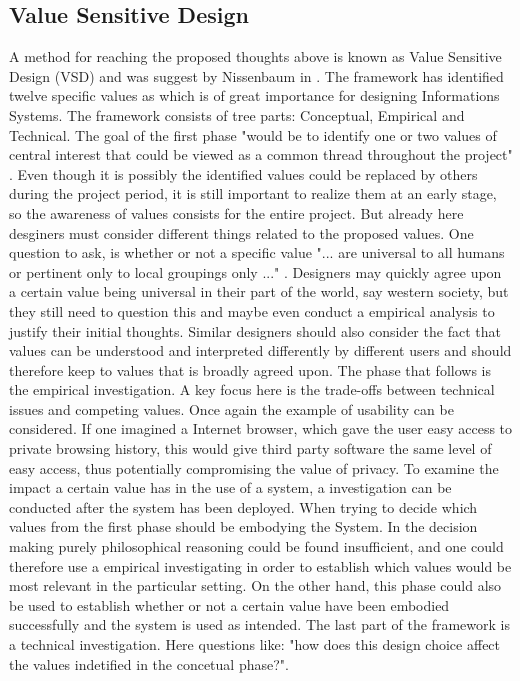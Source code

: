 \subsection{Value Sensitive Design}
A method for reaching the proposed thoughts above is known as Value Sensitive Design (VSD) and was suggest by Nissenbaum in . The framework has identified twelve specific values as which is of great importance for designing Informations Systems. The framework consists of tree parts: Conceptual, Empirical and Technical.
The goal of the first phase "would be to identify one or two values of central interest that could be viewed as a common thread throughout the project" . Even though it is possibly the identified values could be replaced by others during the project period, it is still important to realize them at an early stage, so the awareness of values consists for the entire project. But already here desginers must consider different things related to the proposed values. One question to ask, is whether or not a specific value "... are universal to all humans or pertinent only to local groupings only ..." . Designers may quickly agree upon a certain value being universal in their part of the world, say western society, but they still need to question this and maybe even conduct a empirical analysis to justify their initial thoughts. Similar designers should also consider the fact that values can be understood and interpreted differently by different users and should therefore keep to values that is broadly agreed upon. 
The phase that follows is the empirical investigation. A key focus here is the trade-offs between technical issues and competing values. Once again the example of usability can be considered. If one imagined a Internet browser, which gave the user easy access to private browsing history, this would give third party software the same level of easy access, thus potentially compromising the value of privacy. To examine the impact a certain value has in the use of a system, a investigation can be conducted after the system has been deployed. When trying to decide which values from the first phase should be embodying the System. In the decision making purely philosophical reasoning could be found insufficient, and one could therefore use a empirical investigating in order to establish which values would be most relevant in the particular setting. On the other hand, this phase could also be used to establish whether or not a certain  value have been embodied successfully and the system is used as intended. 
The last  part of the framework is a technical investigation. Here questions like: "how does this design choice affect the values indetified in the concetual phase?". 

